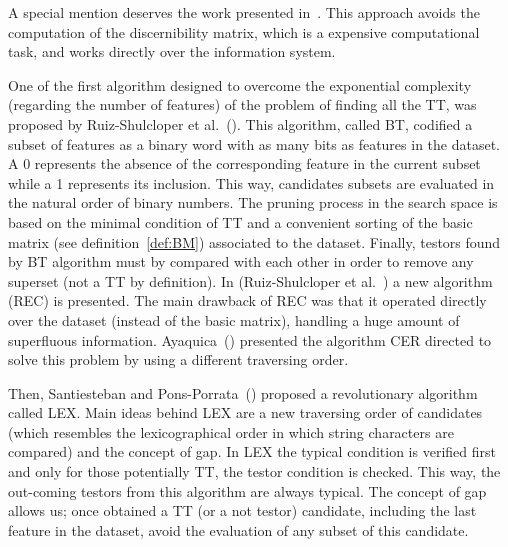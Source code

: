 \documentclass[authoryear,11pt]{elsarticle}
\begin{document}
  A special mention deserves the work presented in~\citep{WangP07}. This approach avoids the computation of the
  discernibility matrix, which is a expensive computational task, and works directly over the information system. 

  
  One of the first algorithm designed to overcome the exponential complexity (regarding
  the number of features) of the problem of finding all the TT, was 
  proposed by Ruiz-Shulcloper et al.~(\cite{Ruiz85}). This algorithm, called BT,
  codified a subset of features as a binary word with as many bits as features in the 
  dataset. A 0 represents the absence of the corresponding feature in the current
  subset while a 1 represents its inclusion. This way, candidates subsets are evaluated
  in the natural order of binary numbers. The pruning process in the
  search space is based on the minimal condition of TT and a convenient sorting
  of the basic matrix (see definition~\ref{def:BM}) associated to the dataset. Finally, 
  testors found by BT algorithm must by compared with each other in order to remove
  any superset (not a TT by definition).
  In (Ruiz-Shulcloper et al.~\cite{Shulcloper95b}) a new algorithm (REC) is presented.
  The main drawback of REC was that it operated directly over the dataset (instead of the
  basic matrix), handling a huge amount of superfluous information. Ayaquica~(\cite{Ayaquica97})
  presented the algorithm CER directed to solve this problem by using a different traversing
  order. 
	
  Then, Santiesteban and Pons-Porrata~(\cite{Santiesteban03}) proposed a revolutionary algorithm
  called LEX. Main ideas behind LEX are a new traversing order of candidates (which resembles the
  lexicographical order in which string characters are compared) and the concept of gap. In LEX
  the typical condition is verified first and only for those potentially TT, the testor 
  condition is checked. This way, the out-coming testors from this algorithm are always typical.
  The concept of gap allows us; once obtained a TT (or a not testor) candidate, including 
  the last feature in the dataset, avoid the evaluation of any subset of this candidate.
	
\end{document}
